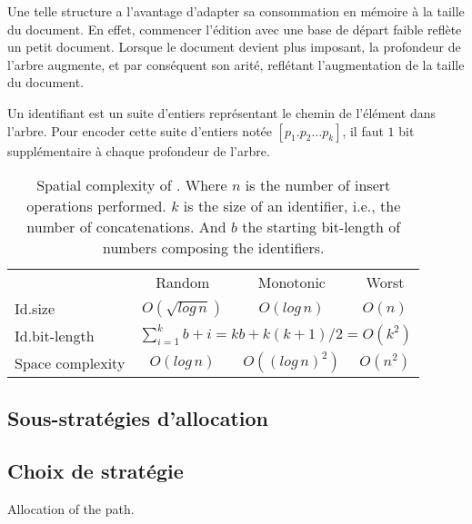 Une telle structure a l'avantage d'adapter sa consommation en mémoire à la
taille du document. En effet, commencer l'édition avec une base de départ faible
reflète un petit document. Lorsque le document devient plus imposant, la
profondeur de l'arbre augmente, et par conséquent son arité, reflétant
l'augmentation de la taille du document.

Un identifiant \LSEQ est un suite d'entiers représentant le chemin de l'élément
dans l'arbre. Pour encoder cette suite d'entiers notée $[p_1.p_2\ldots p_k]$, il
faut $1$ bit supplémentaire à chaque profondeur de l'arbre. 

\begin{table}
  \centering
  \begin{tabular}{@{}lccc@{}}
    \toprule
    & Random & Monotonic & Worst \\ \cmidrule{2-4}
    Id.size & $O(\sqrt{log\,n})$ & $O(log\,n)$ & $O(n)$ \\ \midrule
    Id.bit-length & \multicolumn{3}{c}{ $\sum\limits_{i=1}^{k}b+i =
      kb + k(k+1)/2 = O(k^2)$} \\ \midrule
    Space complexity & $O(log\,n)$ & $O((log\,n)^2)$ &
    $O(n^2)$ \\ \bottomrule
  \end{tabular}
  \caption{Spatial complexity of \LSEQ. Where $n$ is the number
    of insert operations performed. $k$ is the size of an identifier, i.e.,
    the number of concatenations. And $b$ the starting bit-length of numbers
    composing the identifiers.}
\end{table}

\subsection{Sous-stratégies d'allocation}


\subsection{Choix de stratégie}


\begin{algorithm}
  
  \caption{\label{algo:allocpath}Allocation of the path.}
\end{algorithm}

